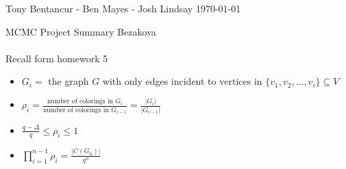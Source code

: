 \documentclass[12]{article}
\begin{document}
\large Tony Bentancur - Ben Mayes - Josh Lindsay
\nobreak
\hfill \today{}

MCMC Project Summary
\hfill Bezakova
\\\\
Recall form homework 5				
\begin{itemize}
\item $\displaystyle G_i = $ the graph $G$ with only edges incident to vertices in $\{v_1, v_2, \ldots ,v_i\} \subseteq V$
\item $\displaystyle\rho_i = \frac{\mbox{number of colorings in } G_{i} }{\mbox{number of colorings in } G_{i-1} } = \frac{|G_i|}{|G_{i-1}|}$
\item $\displaystyle\frac{q-\Delta}{q} \leq \rho_i \leq 1$
\item $\displaystyle\prod_{i=1}^{n-1}{\rho_i} = \frac{|C(G_n)|}{q^n}$
\end{itemize}
						


			
					
							
							
\end{document}
